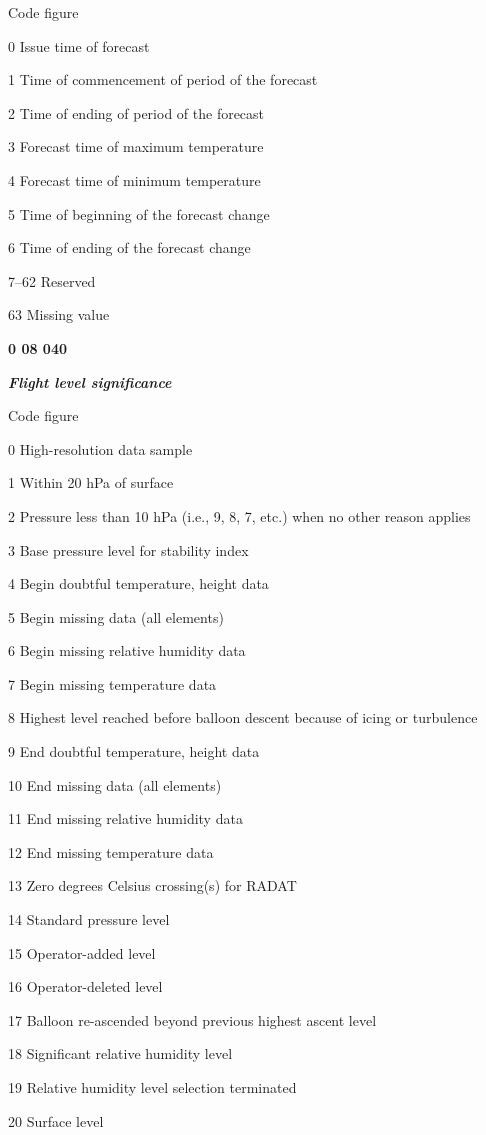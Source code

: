 Code figure

0 Issue time of forecast

1 Time of commencement of period of the forecast

2 Time of ending of period of the forecast

3 Forecast time of maximum temperature

4 Forecast time of minimum temperature

5 Time of beginning of the forecast change

6 Time of ending of the forecast change

7--62 Reserved

63 Missing value

\textbf{0 08 040}

\emph{\textbf{Flight level significance}}

Code figure

0 High-resolution data sample

1 Within 20 hPa of surface

2 Pressure less than 10 hPa (i.e., 9, 8, 7, etc.) when no other reason applies

3 Base pressure level for stability index

4 Begin doubtful temperature, height data

5 Begin missing data (all elements)

6 Begin missing relative humidity data

7 Begin missing temperature data

8 Highest level reached before balloon descent because of icing or turbulence

9 End doubtful temperature, height data

10 End missing data (all elements)

11 End missing relative humidity data

12 End missing temperature data

13 Zero degrees Celsius crossing(s) for RADAT

14 Standard pressure level

15 Operator-added level

16 Operator-deleted level

17 Balloon re-ascended beyond previous highest ascent level

18 Significant relative humidity level

19 Relative humidity level selection terminated

20 Surface level


